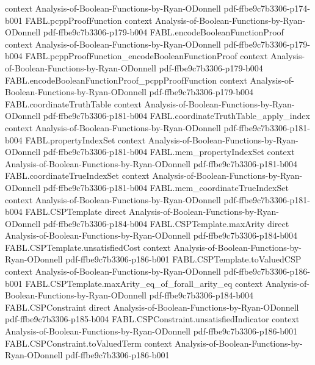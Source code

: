 \begin{theorem}
  {context}
  {Analysis-of-Boolean-Functions-by-Ryan-ODonnell}
  {pdf-ffbe9c7b3306-p174-b001}
\proofstep
  {FABL.pcppProofFunction}
  {context}
  {Analysis-of-Boolean-Functions-by-Ryan-ODonnell}
  {pdf-ffbe9c7b3306-p179-b004}
\proofstep
  {FABL.encodeBooleanFunctionProof}
  {context}
  {Analysis-of-Boolean-Functions-by-Ryan-ODonnell}
  {pdf-ffbe9c7b3306-p179-b004}
\proofstep
  {FABL.pcppProofFunction_encodeBooleanFunctionProof}
  {context}
  {Analysis-of-Boolean-Functions-by-Ryan-ODonnell}
  {pdf-ffbe9c7b3306-p179-b004}
\proofstep
  {FABL.encodeBooleanFunctionProof_pcppProofFunction}
  {context}
  {Analysis-of-Boolean-Functions-by-Ryan-ODonnell}
  {pdf-ffbe9c7b3306-p179-b004}
\proofstep
  {FABL.coordinateTruthTable}
  {context}
  {Analysis-of-Boolean-Functions-by-Ryan-ODonnell}
  {pdf-ffbe9c7b3306-p181-b004}
\proofstep
  {FABL.coordinateTruthTable_apply_index}
  {context}
  {Analysis-of-Boolean-Functions-by-Ryan-ODonnell}
  {pdf-ffbe9c7b3306-p181-b004}
\proofstep
  {FABL.propertyIndexSet}
  {context}
  {Analysis-of-Boolean-Functions-by-Ryan-ODonnell}
  {pdf-ffbe9c7b3306-p181-b004}
\proofstep
  {FABL.mem_propertyIndexSet}
  {context}
  {Analysis-of-Boolean-Functions-by-Ryan-ODonnell}
  {pdf-ffbe9c7b3306-p181-b004}
\proofstep
  {FABL.coordinateTrueIndexSet}
  {context}
  {Analysis-of-Boolean-Functions-by-Ryan-ODonnell}
  {pdf-ffbe9c7b3306-p181-b004}
\proofstep
  {FABL.mem_coordinateTrueIndexSet}
  {context}
  {Analysis-of-Boolean-Functions-by-Ryan-ODonnell}
  {pdf-ffbe9c7b3306-p181-b004}
\proofstep
  {FABL.CSPTemplate}
  {direct}
  {Analysis-of-Boolean-Functions-by-Ryan-ODonnell}
  {pdf-ffbe9c7b3306-p184-b004}
\proofstep
  {FABL.CSPTemplate.maxArity}
  {direct}
  {Analysis-of-Boolean-Functions-by-Ryan-ODonnell}
  {pdf-ffbe9c7b3306-p184-b004}
\proofstep
  {FABL.CSPTemplate.unsatisfiedCost}
  {context}
  {Analysis-of-Boolean-Functions-by-Ryan-ODonnell}
  {pdf-ffbe9c7b3306-p186-b001}
\proofstep
  {FABL.CSPTemplate.toValuedCSP}
  {context}
  {Analysis-of-Boolean-Functions-by-Ryan-ODonnell}
  {pdf-ffbe9c7b3306-p186-b001}
\proofstep
  {FABL.CSPTemplate.maxArity_eq_of_forall_arity_eq}
  {context}
  {Analysis-of-Boolean-Functions-by-Ryan-ODonnell}
  {pdf-ffbe9c7b3306-p184-b004}
\proofstep
  {FABL.CSPConstraint}
  {direct}
  {Analysis-of-Boolean-Functions-by-Ryan-ODonnell}
  {pdf-ffbe9c7b3306-p185-b004}
\proofstep
  {FABL.CSPConstraint.unsatisfiedIndicator}
  {context}
  {Analysis-of-Boolean-Functions-by-Ryan-ODonnell}
  {pdf-ffbe9c7b3306-p186-b001}
\proofstep
  {FABL.CSPConstraint.toValuedTerm}
  {context}
  {Analysis-of-Boolean-Functions-by-Ryan-ODonnell}
  {pdf-ffbe9c7b3306-p186-b001}

\end{theorem}
